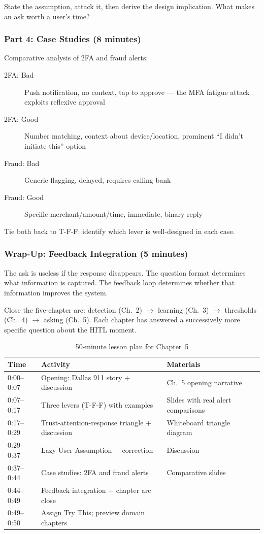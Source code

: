 State the assumption, attack it, then derive the design implication. What makes an ask worth a user's time?

\subsubsection{Part 4: Case Studies (8 minutes)}

Comparative analysis of 2FA and fraud alerts:

\begin{description}
    \item[2FA: Bad] Push notification, no context, tap to approve --- the MFA fatigue attack exploits reflexive approval
    \item[2FA: Good] Number matching, context about device/location, prominent ``I didn't initiate this'' option
    \item[Fraud: Bad] Generic flagging, delayed, requires calling bank
    \item[Fraud: Good] Specific merchant/amount/time, immediate, binary reply
\end{description}

Tie both back to T-F-F: identify which lever is well-designed in each case.

\subsubsection{Wrap-Up: Feedback Integration (5 minutes)}

The ask is useless if the response disappears. The question format determines what information is captured. The feedback loop determines whether that information improves the system.

Close the five-chapter arc: detection (Ch.\ 2) $\to$ learning (Ch.\ 3) $\to$ thresholds (Ch.\ 4) $\to$ asking (Ch.\ 5). Each chapter has answered a successively more specific question about the HITL moment.

\begin{table}[htbp]
\caption{50-minute lesson plan for Chapter~5}
\label{tab:lesson-plan-ch05}
\centering
\begin{tabular}{@{}p{2.5cm}p{6cm}p{4cm}@{}}
\toprule
\textbf{Time} & \textbf{Activity} & \textbf{Materials} \\
\midrule
0:00--0:07 & Opening: Dallas 911 story + discussion & Ch.\ 5 opening narrative \\
0:07--0:17 & Three levers (T-F-F) with examples & Slides with real alert comparisons \\
0:17--0:29 & Trust-attention-response triangle + discussion & Whiteboard triangle diagram \\
0:29--0:37 & Lazy User Assumption + correction & Discussion \\
0:37--0:44 & Case studies: 2FA and fraud alerts & Comparative slides \\
0:44--0:49 & Feedback integration + chapter arc close & \\
0:49--0:50 & Assign Try This; preview domain chapters & \\
\bottomrule
\end{tabular}
\end{table}

